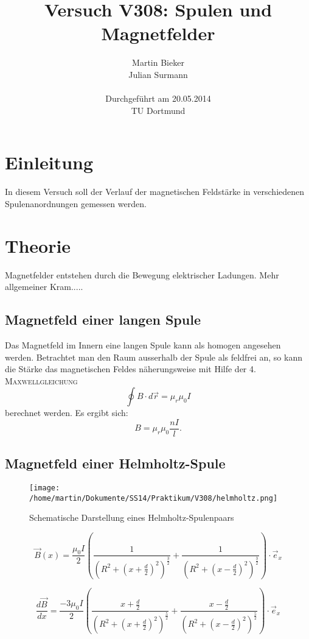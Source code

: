 \documentclass[11pt,ngerman,a4paper]{article}
\title{\textbf{Versuch V308: Spulen und Magnetfelder}}
\author{Martin Bieker\\
		Julian Surmann\\
		\\
		Durchgef\"{u}hrt am 20.05.2014\\
		TU Dortmund}
\date{}
\begin{document}
\renewcommand\tablename{Tabelle}
\renewcommand\figurename{Abbildung}
\maketitle
\thispagestyle{empty}
\newpage
\clearpage
\setcounter{page}{1}


\section{Einleitung}
In diesem Versuch soll der Verlauf der magnetischen Feldstärke in verschiedenen Spulenanordnungen gemessen werden. 
\section{Theorie}
Magnetfelder entstehen durch die Bewegung elektrischer Ladungen. Mehr allgemeiner Kram.....

\subsection{Magnetfeld einer langen Spule}
Das Magnetfeld im Innern eine langen Spule kann als homogen angesehen werden. Betrachtet man den Raum ausserhalb der Spule als feldfrei an, so kann die Stärke das magnetischen Feldes näherungsweise mit Hilfe der \textsc{4. Maxwellgleichung} 
\begin{equation}
\oint B\cdot d\vec r = \mu_r\mu_0 I
\end{equation}
berechnet werden. Es ergibt sich:
\
\begin{equation}
B = \mu_r\mu_0\frac{nI}l\mathrm.
\end{equation}
\subsection{Magnetfeld einer Helmholtz-Spule}

\begin{figure}[htp]
\centering
\texttt{[image: /home/martin/Dokumente/SS14/Praktikum/V308/helmholtz.png]}
\caption{Schematische Darstellung eines Helmholtz-Spulenpaars}
\label{}
\end{figure}
\begin{equation}
\vec B(x)= \frac{\mu_0I}{2}\left(\frac1{\left(R^2 + (x+\frac d2)^2 \right)^\frac32} + \frac1{\left(R^2 + (x-\frac d2)^2 \right)^\frac32}  \right) \cdot \vec e_x
\end{equation}

\begin{equation}
\frac{d\vec B}{d x} = \frac{-3\mu_0I}{2}\left( \frac{x+\frac d2}{\left(R^2 + (x+\frac d2)^2 \right)^\frac52} + \frac{x-\frac d2}{\left(R^2 + (x-\frac d2)^2 \right)^\frac52}\right) \cdot \vec e_x
\end{equation}
\end{document}
